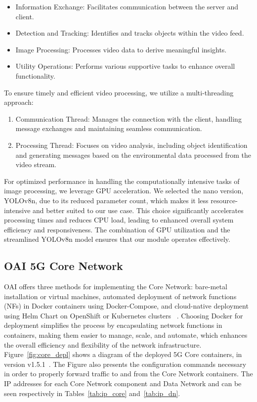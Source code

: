 \begin{itemize}
\item Information Exchange: Facilitates communication between the server and client.
\item Detection and Tracking: Identifies and tracks objects within the video feed.
\item Image Processing: Processes video data to derive meaningful insights.
\item Utility Operations: Performs various supportive tasks to enhance overall functionality.
\end{itemize}

To ensure timely and efficient video processing, we utilize a multi-threading approach:

\begin{enumerate}
\item Communication Thread: Manages the connection with the client, handling message exchanges and maintaining seamless communication.
\item Processing Thread: Focuses on video analysis, including object identification and generating messages based on the environmental data processed from the video stream.
\end{enumerate}

For optimized performance in handling the computationally intensive tasks of image processing, we leverage GPU acceleration.
We selected the nano version, YOLOv8n, due to its reduced parameter count, which makes it less resource-intensive and better suited to our use case.
This choice significantly accelerates processing times and reduces CPU load, leading to enhanced overall system efficiency and responsiveness.
The combination of GPU utilization and the streamlined YOLOv8n model ensures that our module operates effectively.



\subsection{OAI 5G Core Network}\label{subsec:oai-5g-core-network}
OAI offers three methods for implementing the Core Network: bare-metal installation or virtual machines, automated deployment of network functions (NFs) in Docker containers using Docker-Compose, and cloud-native deployment using Helm Chart on OpenShift or Kubernetes clusters ~\cite{oai5gcore}.
Choosing Docker for deployment simplifies the process by encapsulating network functions in containers, making them easier to manage, scale, and automate, which enhances the overall efficiency and flexibility of the network infrastructure.
Figure~\ref{fig:core_depl} shows a diagram of the deployed 5G Core containers, in version v1.5.1~\cite{oai-cn5g-fed-v1.5.1}.
The Figure also presents the configuration commands necessary in order to properly forward traffic to and from the Core Network containers.
The IP addresses for each Core Network component and Data Network and can be seen respectively in Tables~\ref{tab:ip_core} and~\ref{tab:ip_dn}.


